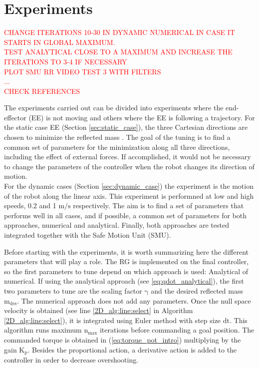 \chapter{Experiments}
\label{ch:experiments}

\textcolor{red}{CHANGE ITERATIONS 10-30 IN DYNAMIC NUMERICAL IN CASE IT STARTS IN GLOBAL MAXIMUM. \\
TEST ANALYTICAL CLOSE TO A MAXIMUM AND INCREASE THE ITERATIONS TO 3-4 IF NECESSARY \\
PLOT SMU RR VIDEO TEST 3 WITH FILTERS\\
...\\
CHECK REFERENCES
}



The experiments carried out can be divided into experiments where the end-effector (EE) is not moving  and others where the EE is following a trajectory. 
For the static case EE (Section \ref{sec:static_case}), the three Cartesian directions are chosen to minimize the reflected mass . The goal of the tuning is to find a common set of parameters for the minimization along all three directions, including the effect of external forces. If accomplished, it would not be necessary to change the parameters of the controller when the robot changes its direction of motion.\\
%
For the dynamic cases (Section \ref{sec:dynamic_case}) the  experiment is the motion of the robot along the linear axis. This experiment is performned at low and high speeds, 0.2 and 1 $\mathrm{m/s}$ respectively. 
The aim is to find a set of parameters that performs well in all cases, and if possible, a common set of parameters for both approaches, numerical and analytical.
Finally, both approaches are tested integrated together with the Safe Motion Unit (SMU). 

Before starting with the experiments, it is worth summarizing here the different parameters that will play a role. 
The RG is implemented on the final controller, so the first parameters to tune depend on which approach is used: Analytical of numerical. If using the analytical approach (see \ref{eq:qdot_analytical}), the first two parameters to tune are the scaling factor $\mathrm{\gamma}$ and the desired reflected mass $\mathrm{m_{des}}$. The numerical approach does not add any parameters. Once the null space velocity is obtained (see line \ref{2D_alg:line:select} in Algorithm \ref{2D_alg:line:select}), it is integrated using Euler method with step size $\mathrm{dt}$. This algorithm runs maximum $\mathrm{n_{max}}$ iterations before commanding a goal position. The commanded torque is obtained in (\ref{eq:torque_pot_intro}) multiplying by the gain $\mathrm{K_p}$. Besides the proportional action, a derivative action is added to the controller in order to decrease overshooting.



